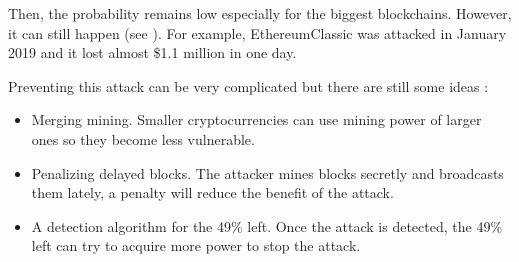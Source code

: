 Then, the probability remains low especially for the biggest blockchains. However, it can still happen (see \cite{blockchains_51_attack}). For example, EthereumClassic was attacked in January 2019 and it lost almost \$1.1 million in one day.

Preventing this attack can be very complicated but there are still some ideas :

\begin{itemize}
  \item Merging mining. Smaller cryptocurrencies can use mining power of larger ones so they become less vulnerable.
  \item Penalizing delayed blocks. The attacker mines blocks secretly and broadcasts them lately, a penalty will reduce the benefit of the attack.
  \item A detection algorithm for the 49\% left. Once the attack is detected, the 49\% left can try to acquire more power to stop the attack.
\end{itemize}
